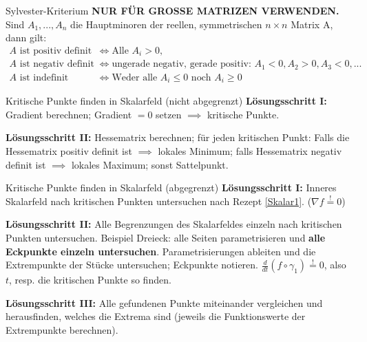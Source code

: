 \begin{Satz}{Sylvester-Kriterium}{}
	\textbf{NUR FÜR GROSSE MATRIZEN VERWENDEN.}
	Sind $A_1, ..., A_n$ die Hauptminoren der reellen, symmetrischen $n \times n$ Matrix A, dann gilt:
	\begin{align*}
		A \text{ ist positiv definit} &\iff \text{Alle }A_i > 0,\\
		A \text{ ist negativ definit} &\iff \text{ungerade negativ, gerade positiv: }A_1 < 0, A_2 > 0, A_3 < 0,...\\
		A \text{ ist indefinit} &\iff \text{Weder alle }A_i \leq 0 \text{ noch }A_i \geq 0 
	\end{align*}
\end{Satz}

\begin{Rezept}[label=Skalar1]{Kritische Punkte finden in Skalarfeld (nicht abgegrenzt)}{}
	\textbf{Lösungsschritt I:} Gradient berechnen; Gradient $=0$ setzen $\implies$ kritische Punkte.
	
	\textbf{Lösungsschritt II:} Hessematrix berechnen; für jeden kritischen Punkt: Falls die Hessematrix positiv definit ist $\implies$ lokales Minimum; falls Hessematrix negativ definit ist $\implies$ lokales Maximum; sonst Sattelpunkt.
\end{Rezept}

\begin{Rezept}[label=Skalar2]{Kritische Punkte finden in Skalarfeld (abgegrenzt)}{}
	\textbf{Lösungsschritt I:} Inneres Skalarfeld nach kritischen Punkten untersuchen nach Rezept \ref{Skalar1}. ($\nabla f \stackrel{!}{=} 0$)
	
	\textbf{Lösungsschritt II:} Alle Begrenzungen des Skalarfeldes einzeln nach kritischen Punkten untersuchen. Beispiel Dreieck: alle Seiten parametrisieren und \textbf{alle Eckpunkte einzeln untersuchen}. Parametrisierungen ableiten und die Extrempunkte der Stücke untersuchen; Eckpunkte notieren.
	$\frac{d}{dt}(f \circ \gamma_1) \stackrel{!}{=} 0$, also $t$, resp. die kritischen Punkte so finden.
	
	\textbf{Lösungsschritt III:} Alle gefundenen Punkte miteinander vergleichen und herausfinden, welches die Extrema sind (jeweils die Funktionswerte der Extrempunkte berechnen).
\end{Rezept}

